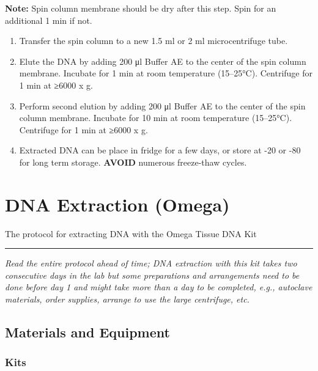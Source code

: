 \documentclass[
  letterpaper,
  DIV=11,
  numbers=noendperiod]{scrreprt}
\begin{document}
\textbf{Note:} Spin column membrane should be dry after this step. Spin
for an additional 1 min if not.

\begin{enumerate}
\def\labelenumi{\arabic{enumi}.}
\item
  Transfer the spin column to a new 1.5 ml or 2 ml microcentrifuge tube.
\item
  Elute the DNA by adding 200 μl Buffer AE to the center of the spin
  column membrane. Incubate for 1 min at room temperature (15--25°C).
  Centrifuge for 1 min at ≥6000 x g.
\item
  Perform second elution by adding 200 μl Buffer AE to the center of the
  spin column membrane. Incubate for 10 min at room temperature
  (15--25°C). Centrifuge for 1 min at ≥6000 x g.
\item
  Extracted DNA can be place in fridge for a few days, or store at -20
  or -80 for long term storage. \textbf{AVOID} numerous freeze-thaw
  cycles.\\
\end{enumerate}

\hypertarget{dna-extraction-omega}{%
\chapter{DNA Extraction (Omega)}\label{dna-extraction-omega}}

The protocol for extracting DNA with the Omega Tissue DNA Kit

\begin{center}\rule{0.5\linewidth}{0.5pt}\end{center}

\emph{Read the entire protocol ahead of time; DNA extraction with this
kit takes two consecutive days in the lab but some preparations and
arrangements need to be done before day 1 and might take more than a day
to be completed, e.g., autoclave materials, order supplies, arrange to
use the large centrifuge, etc.}

\hypertarget{materials-and-equipment-1}{%
\section*{\texorpdfstring{\textbf{Materials and
Equipment}}{Materials and Equipment}}\label{materials-and-equipment-1}}

\hypertarget{kits}{%
\subsection*{\texorpdfstring{\textbf{Kits}}{Kits}}\label{kits}}
\end{document}
